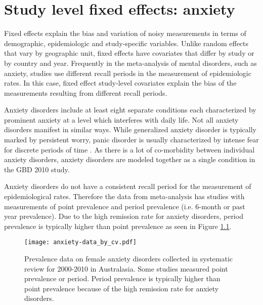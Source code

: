 \chapter{Study level fixed effects: anxiety}
\label{applications-efx_study_level}

Fixed effects explain the bias and variation of noisy measurements in terms of demographic, epidemiologic and study-specific variables.  Unlike random effects that vary by geographic unit, fixed effects have covariates that differ by study or by country and year.  Frequently in the meta-analysis of mental disorders, such as anxiety, studies use different recall periods in the measurement of epidemiologic rates.  In this case, fixed effect study-level covariates explain the bias of the measurements resulting from different recall periods.

Anxiety disorders include at least eight separate conditions each characterized by prominent anxiety at a level which interferes with daily life.  Not all anxiety disorders manifest in similar ways.  While generalized anxiety disorder is typically marked by persistent worry, panic disorder is usually characterized by intense fear for discrete periods of time \cite{american_diagnostic_2000}.  As there is a lot of co-morbidity between individual anxiety disorders, anxiety disorders are modeled together as a single condition in the GBD 2010 study.

Anxiety disorders do not have a consistent recall period for the measurement of epidemiological rates.  Therefore the data from meta-analysis has studies with measurements of point prevalence and period prevalence (i.e. 6-month or past year prevalence).  Due to the high remission rate for anxiety disorders, period prevalence is typically higher than point prevalence as seen in Figure \ref{fig:app-anxiety data}.

    \begin{figure}[h]
        \begin{center}
            \texttt{[image: anxiety-data\_by\_cv.pdf]}
            \caption{Prevalence data on female anxiety disorders collected in systematic review for 2000-2010 in Australasia.  Some studies measured point prevalence or period.  Period prevalence is typically higher than point prevalence because of the high remission rate for anxiety disorders.}
            \label{fig:app-anxiety data}
        \end{center}
    \end{figure}

